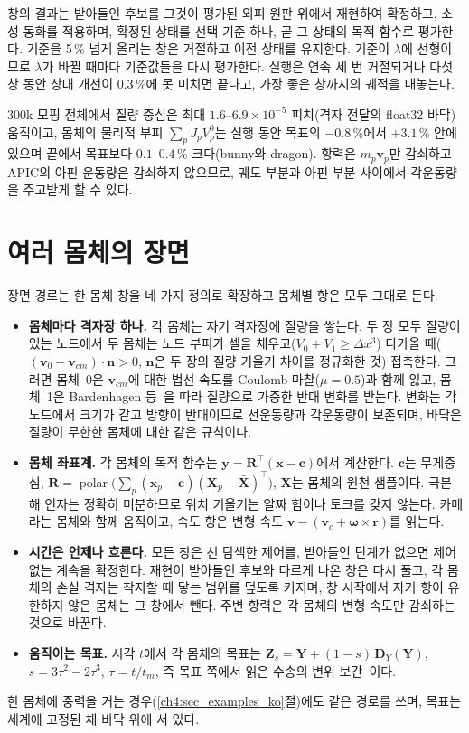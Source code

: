 창의 결과는 받아들인 후보를 그것이 평가된 외피 원판 위에서 재현하여 확정하고, 소성 동화를 적용하며, 확정된 상태를 선택 기준
하나, 곧 그 상태의 목적 함수로 평가한다. 기준을 5\,\% 넘게 올리는 창은 거절하고 이전 상태를 유지한다. 기준이 $\lambda$에
선형이므로 $\lambda$가 바뀔 때마다 기준값들을 다시 평가한다. 실행은 연속 세 번 거절되거나 다섯 창 동안 상대 개선이 0.3\,\%에
못 미치면 끝나고, 가장 좋은 창까지의 궤적을 내놓는다.

300k 모핑 전체에서 질량 중심은 최대 $1.6$--$6.9\times10^{-5}$ 피치(격자 전달의 float32 바닥) 움직이고, 몸체의 물리적 부피
$\sum_p J_pV^0_p$는 실행 동안 목표의 $-0.8$\,\%에서 $+3.1$\,\% 안에 있으며 끝에서 목표보다 $0.1$--$0.4$\,\% 크다(bunny와
dragon). 항력은 $m_p\mathbf{v}_p$만 감쇠하고 APIC의 아핀 운동량은 감쇠하지 않으므로, 궤도 부분과 아핀 부분 사이에서 각운동량을
주고받게 할 수 있다.

\section{여러 몸체의 장면}
\label{ch4:sec_scene_ko}
장면 경로는 한 몸체 창을 네 가지 정의로 확장하고 몸체별 항은 모두 그대로 둔다.
\begin{itemize}
  \item \textbf{몸체마다 격자장 하나.} 각 몸체는 자기 격자장에 질량을 쌓는다. 두 장 모두 질량이 있는 노드에서 두 몸체는 노드
        부피가 셀을 채우고($V_0+V_1\ge\Delta x^3$) 다가올 때($(\mathbf{v}_0-\mathbf{v}_{cm})\cdot\mathbf{n}>0$, $\mathbf{n}$은 두
        장의 질량 기울기 차이를 정규화한 것) 접촉한다. 그러면 몸체~0은 $\mathbf{v}_{cm}$에 대한 법선 속도를 Coulomb
        마찰($\mu=0.5$)과 함께 잃고, 몸체~1은 Bardenhagen 등~\citep{bardenhagen2000granular}을 따라 질량으로 가중한 반대 변화를
        받는다. 변화는 각 노드에서 크기가 같고 방향이 반대이므로 선운동량과 각운동량이 보존되며, 바닥은 질량이 무한한 몸체에
        대한 같은 규칙이다.
  \item \textbf{몸체 좌표계.} 각 몸체의 목적 함수는 $\mathbf{y}=\mathbf{R}^{\top}(\mathbf{x}-\mathbf{c})$에서 계산한다. $\mathbf{c}$는
        무게중심, $\mathbf{R}=\operatorname{polar}\big(\sum_p(\mathbf{x}_p-\mathbf{c})(\mathbf{X}_p-\bar{\mathbf{X}})^{\top}\big)$,
        $\mathbf{X}$는 몸체의 원천 샘플이다. 극분해 인자는 정확히 미분하므로 위치 기울기는 알짜 힘이나 토크를 갖지 않는다.
        카메라는 몸체와 함께 움직이고, 속도 항은 변형 속도 $\mathbf{v}-(\mathbf{v}_c+\boldsymbol{\omega}\times\mathbf{r})$를 읽는다.
  \item \textbf{시간은 언제나 흐른다.} 모든 창은 선 탐색한 제어를, 받아들인 단계가 없으면 제어 없는 계속을 확정한다. 재현이
        받아들인 후보와 다르게 나온 창은 다시 풀고, 각 몸체의 손실 격자는 착지할 때 닿는 범위를 덮도록 커지며, 창 시작에서
        자기 항이 유한하지 않은 몸체는 그 창에서 뺀다. 주변 항력은 각 몸체의 변형 속도만 감쇠하는 것으로 바꾼다.
  \item \textbf{움직이는 목표.} 시각 $t$에서 각 몸체의 목표는 $\mathbf{Z}_s=\mathbf{Y}+(1-s)\,\mathbf{D}_Y(\mathbf{Y})$,
        $s=3\tau^2-2\tau^3$, $\tau=t/t_m$, 즉 목표 쪽에서 읽은 수송의 변위 보간~\citep{mccann1997convexity}이다.
\end{itemize}
한 몸체에 중력을 거는 경우(\ref{ch4:sec_examples_ko}절)에도 같은 경로를 쓰며, 목표는 세계에 고정된 채 바닥 위에 서 있다.

